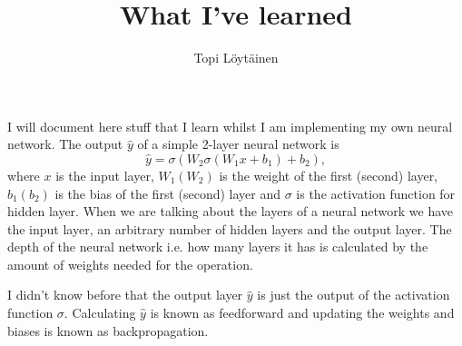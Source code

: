 \documentclass[12pt]{article}
\title{What I've learned}
\author{Topi Löytäinen}
\date{}
\begin{document}
\maketitle

I will document here stuff that I learn whilst I am implementing my own neural network. The output $\hat{y}$ of a simple 2-layer neural network is
\begin{equation}
\hat{y} = \sigma (W_2 \sigma (W_1 x + b_1) + b_2),
\end{equation}
where $x$ is the input layer, $W_1 (W_2)$ is the weight of the first (second) layer, $b_1 (b_2)$ is the bias of the first (second) layer and $\sigma$ is the activation function for hidden layer. When we are talking about the layers of a neural network we have the input layer, an arbitrary number of hidden layers and the output layer. The depth of the neural network i.e. how many layers it has is calculated by the amount of weights needed for the operation.

I didn't know before that the output layer $\hat{y}$ is just the output of the activation function $\sigma$. Calculating $\hat{y}$ is known as feedforward and updating the weights and biases is known as backpropagation.
\end{document}
